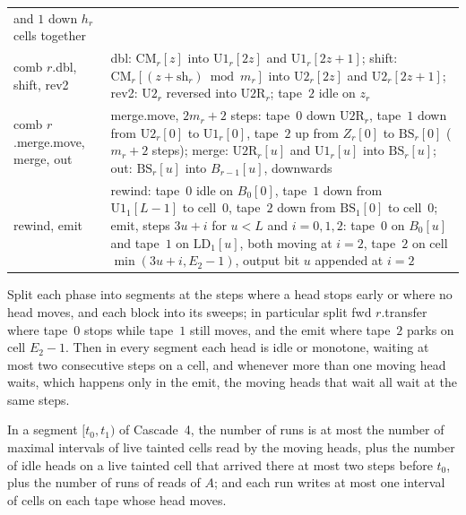 \begin{center}
\begin{longtable}{>{\raggedright\arraybackslash}p{}>{\raggedright\arraybackslash}p{}}
and $1$ down $h_r$ cells together \\
comb $r$.dbl, shift, rev2 & dbl: $\mathrm{CM}_r[z]$ into $\mathrm{U1}_r[2z]$ and $\mathrm{U1}_r[2z+1]$; shift:
$\mathrm{CM}_r[(z+\mathrm{sh}_r)\bmod m_r]$ into $\mathrm{U2}_r[2z]$ and $\mathrm{U2}_r[2z+1]$; rev2: $\mathrm{U2}_r$ reversed into
$\mathrm{U2R}_r$; tape~$2$ idle on $z_r$ \\
comb $r$.merge.move, merge, out & merge.move, $2m_r+2$ steps: tape~$0$ down $\mathrm{U2R}_r$, tape~$1$ down from $\mathrm{U2}_r[0]$ to
$\mathrm{U1}_r[0]$, tape~$2$ up from $Z_r[0]$ to $\mathrm{BS}_r[0]$ ($m_r+2$ steps); merge: $\mathrm{U2R}_r[u]$ and $\mathrm{U1}_r[u]$ into
$\mathrm{BS}_r[u]$; out: $\mathrm{BS}_r[u]$ into $B_{r-1}[u]$, downwards \\
rewind, emit & rewind: tape~$0$ idle on $B_0[0]$, tape~$1$ down from $\mathrm{U1}_1[L-1]$ to cell~$0$, tape~$2$ down from
$\mathrm{BS}_1[0]$ to cell~$0$; emit, steps $3u+i$ for $u<L$ and $i=0,1,2$: tape~$0$ on $B_0[u]$ and tape~$1$ on $\mathrm{LD}_1[u]$, both
moving at $i=2$, tape~$2$ on cell $\min(3u+i,E_2-1)$, output bit $u$ appended at $i=2$ \\
\bottomrule
\end{longtable}
\end{center}

Split each phase into segments at the steps where a head stops early or where no head moves, and each block into its sweeps; in
particular split fwd $r$.transfer where tape~$0$ stops while tape~$1$ still moves, and the emit where tape~$2$ parks on cell
$E_2-1$. Then in every segment each head is idle or monotone, waiting at most two consecutive steps on a cell, and whenever more than one
moving head waits, which happens only in the emit, the moving heads that wait all wait at the same steps.

\begin{lemma}\label{lem:c4-segments}
\notformalized
In a segment $[t_0,t_1)$ of Cascade~4, the number of runs is at most the number of maximal intervals of live tainted cells read by the
moving heads, plus the number of idle heads on a live tainted cell that arrived there at most two steps before $t_0$, plus the number
of runs of reads of $A$; and each run writes at most one interval of cells on each tape whose head moves.
\end{lemma}

